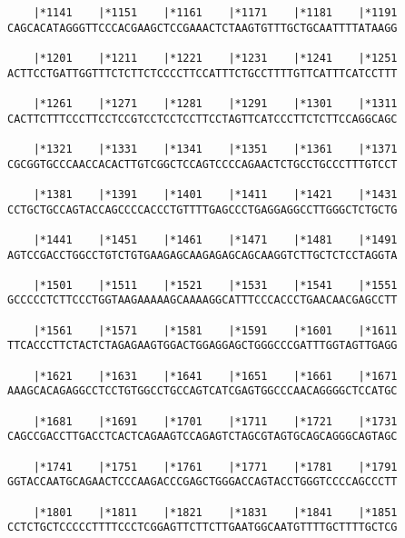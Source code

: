 \documentclass{article}
\begin{document}
\begin{Verbatim}
    |*1141    |*1151    |*1161    |*1171    |*1181    |*1191
CAGCACATAGGGTTCCCACGAAGCTCCGAAACTCTAAGTGTTTGCTGCAATTTTATAAGG
                                                            
    |*1201    |*1211    |*1221    |*1231    |*1241    |*1251
ACTTCCTGATTGGTTTCTCTTCTCCCCTTCCATTTCTGCCTTTTGTTCATTTCATCCTTT
                                                            
    |*1261    |*1271    |*1281    |*1291    |*1301    |*1311
CACTTCTTTCCCTTCCTCCGTCCTCCTCCTTCCTAGTTCATCCCTTCTCTTCCAGGCAGC
                                                            
    |*1321    |*1331    |*1341    |*1351    |*1361    |*1371
CGCGGTGCCCAACCACACTTGTCGGCTCCAGTCCCCAGAACTCTGCCTGCCCTTTGTCCT
                                                            
    |*1381    |*1391    |*1401    |*1411    |*1421    |*1431
CCTGCTGCCAGTACCAGCCCCACCCTGTTTTGAGCCCTGAGGAGGCCTTGGGCTCTGCTG
                                                            
    |*1441    |*1451    |*1461    |*1471    |*1481    |*1491
AGTCCGACCTGGCCTGTCTGTGAAGAGCAAGAGAGCAGCAAGGTCTTGCTCTCCTAGGTA
                                                            
    |*1501    |*1511    |*1521    |*1531    |*1541    |*1551
GCCCCCTCTTCCCTGGTAAGAAAAAGCAAAAGGCATTTCCCACCCTGAACAACGAGCCTT
                                                            
    |*1561    |*1571    |*1581    |*1591    |*1601    |*1611
TTCACCCTTCTACTCTAGAGAAGTGGACTGGAGGAGCTGGGCCCGATTTGGTAGTTGAGG
                                                            
    |*1621    |*1631    |*1641    |*1651    |*1661    |*1671
AAAGCACAGAGGCCTCCTGTGGCCTGCCAGTCATCGAGTGGCCCAACAGGGGCTCCATGC
                                                            
    |*1681    |*1691    |*1701    |*1711    |*1721    |*1731
CAGCCGACCTTGACCTCACTCAGAAGTCCAGAGTCTAGCGTAGTGCAGCAGGGCAGTAGC
                                                            
    |*1741    |*1751    |*1761    |*1771    |*1781    |*1791
GGTACCAATGCAGAACTCCCAAGACCCGAGCTGGGACCAGTACCTGGGTCCCCAGCCCTT
                                                            
    |*1801    |*1811    |*1821    |*1831    |*1841    |*1851
CCTCTGCTCCCCCTTTTCCCTCGGAGTTCTTCTTGAATGGCAATGTTTTGCTTTTGCTCG
                                                            

\end{Verbatim}
\end{document}
